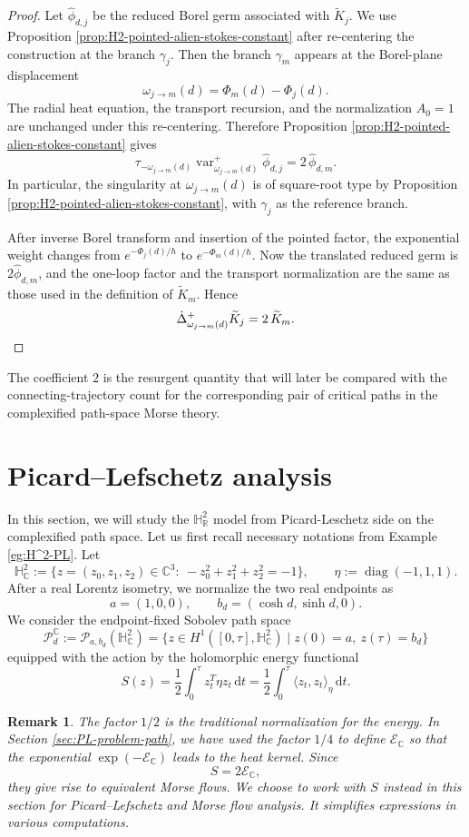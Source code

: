 \documentclass[11pt]{amsart}
\theoremstyle{plain}
\newtheorem{rmk}[thm]{Remark}
\theoremstyle{definition}
\newcommand{\R}{\mathbb{R}}
\newcommand{\C}{\mathbb{C}}
\newcommand{\dd}{\mathrm d}
\newcommand{\PP}{\mathcal{P}}
\newcommand{\HH}{\mathbb{H}}
\DeclareMathOperator{\diag}{diag}
\begin{document}
\begin{proof}
Let $\widehat\phi_{d,j}$ be the reduced Borel germ associated with
$\widetilde K_j$.  We use Proposition \ref{prop:H2-pointed-alien-stokes-constant} after re-centering the
construction at the branch $\gamma_j$. Then the branch $\gamma_m$ appears at the Borel-plane
displacement
\[
\omega_{j\to m}(d)=\Phi_m(d)-\Phi_j(d).
\]
The radial heat equation, the transport recursion, and the normalization
$A_0=1$ are unchanged under this re-centering.  Therefore
Proposition \ref{prop:H2-pointed-alien-stokes-constant} gives
\[
\tau_{-\omega_{j\to m}(d)}\operatorname{var}^{+}_{\omega_{j\to m}(d)}\widehat\phi_{d,j}
=2\,\widehat\phi_{d,m}.
\]
In particular, the singularity at $\omega_{j\to m}(d)$ is of square-root type by
Proposition \ref{prop:H2-pointed-alien-stokes-constant}, with $\gamma_j$ as the reference branch.

After inverse Borel transform and insertion of the pointed factor, the exponential weight changes from $e^{-\Phi_j(d)/\hbar}$ to
$e^{-\Phi_m(d)/\hbar}$.
Now the translated reduced germ is $2\widehat\phi_{d,m}$, and the one-loop
factor and the transport normalization are the same as those used in the
definition of $\widetilde K_m$.  Hence
\[
\dot\Delta^{+}_{\omega_{j\to m}(d)}\widetilde K_j
=2\,\widetilde K_m.\qedhere
\]
\end{proof}


The coefficient $2$ is the resurgent quantity that will later be compared
with the connecting-trajectory count for the corresponding pair of critical
paths in the complexified path-space Morse theory.



\section{Picard–Lefschetz analysis}\label{sec:H^2-flow}
In this section, we will study the $\HH_{\R}^2$ model from Picard-Leschetz side on the complexified path space. Let us first recall necessary notations from Example \ref{eg:H^2-PL}. Let
\[
\HH_{\C}^2:=\bigl\{z=(z_0,z_1,z_2)\in \C^3:\ -z_0^2+z_1^2+z_2^2=-1\bigr\},
\qquad
\eta:=\diag(-1,1,1).
\]
After a real Lorentz isometry, we normalize the two real endpoints as
\[
a=(1,0,0),
\qquad
b_d=(\cosh d,\sinh d,0).
\]
We consider the endpoint-fixed Sobolev path space
\[
\PP_d^{\C}:=\PP_{a,b_d}(\mathbb{H}_{\C}^2)=\bigl\{z\in H^1([0,\tau],\HH_{\C}^2)\mid z(0)=a,\ z(\tau)=b_d\bigr\}
\]
equipped with the action by the holomorphic energy functional
$$
S(z)=\frac12\int_0^{\tau} z_t^T\eta z_t\,\dd t=\frac{1}{2}\int_0^{\tau}\langle z_t,z_t\rangle_{\eta}\,\dd t.
$$
\begin{rmk} The factor $1/2$ is the traditional normalization for the energy. In Section \ref{sec:PL-problem-path}, we have used the factor $1/4$ to define $\mathcal E_{\C}$ so that the exponential $\exp(-\mathcal E_{\C})$ leads to the heat kernel.  Since
$$
S=2\mathcal E_{\C},
$$
they give rise to equivalent Morse flows. We choose to work with $S$ instead in this section for Picard–Lefschetz and Morse flow analysis. It simplifies expressions in various computations. 
\end{rmk}
\end{document}
